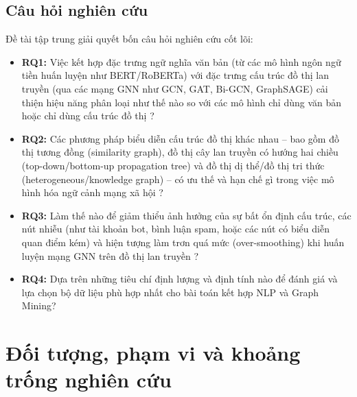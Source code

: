 \documentclass[11pt,a4paper]{extreport}
\begin{document}
\subsection{Câu hỏi nghiên cứu}
Đề tài tập trung giải quyết bốn câu hỏi nghiên cứu cốt lõi:
\begin{itemize}
    \item \textbf{RQ1:} Việc kết hợp đặc trưng ngữ nghĩa văn bản (từ các mô hình ngôn ngữ tiền huấn luyện như BERT/RoBERTa) với đặc trưng cấu trúc đồ thị lan truyền (qua các mạng GNN như GCN, GAT, Bi-GCN, GraphSAGE) cải thiện hiệu năng phân loại như thế nào so với các mô hình chỉ dùng văn bản hoặc chỉ dùng cấu trúc đồ thị \cite{noauthor_comparative_2024, noauthor_dual_2025}?
    \item \textbf{RQ2:} Các phương pháp biểu diễn cấu trúc đồ thị khác nhau -- bao gồm đồ thị tương đồng (similarity graph), đồ thị cây lan truyền có hướng hai chiều (top-down/bottom-up propagation tree) và đồ thị dị thể/đồ thị tri thức (heterogeneous/knowledge graph) -- có ưu thế và hạn chế gì trong việc mô hình hóa ngữ cảnh mạng xã hội \cite{noauthor_disinformation_2024, noauthor_improving_2025, noauthor_integrating_2025}?
    \item \textbf{RQ3:} Làm thế nào để giảm thiểu ảnh hưởng của sự bất ổn định cấu trúc, các nút nhiễu (như tài khoản bot, bình luận spam, hoặc các nút có biểu diễn quan điểm kém) và hiện tượng làm trơn quá mức (over-smoothing) khi huấn luyện mạng GNN trên đồ thị lan truyền \cite{noauthor_exploiting_2024, noauthor_dual_2025, noauthor_integrating_2025}?
    \item \textbf{RQ4:} Dựa trên những tiêu chí định lượng và định tính nào để đánh giá và lựa chọn bộ dữ liệu phù hợp nhất cho bài toán kết hợp NLP và Graph Mining?
\end{itemize}

\section{Đối tượng, phạm vi và khoảng trống nghiên cứu}
\end{document}
